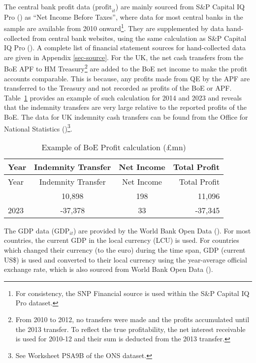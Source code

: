 \documentclass[
  a4paper,
  abstract=true]{scrartcl}
\theoremstyle{definition}
\begin{document}
The central bank profit data (\(\text{profit}_{it}\)) are mainly sourced
from S\&P Capital IQ Pro () as ``Net Income
Before Taxes'', where data for most central banks in the sample are
available from 2010 onward\footnote{For consistency, the SNP Financial
  source is used within the S\&P Capital IQ Pro dataset.}. They are
supplemented by data hand-collected from central bank websites, using
the same calculation as S\&P Capital IQ Pro
(). A complete list of financial statement
sources for hand-collected data are given in Appendix \ref{sec-source}.
For the UK, the net cash transfers from the BoE APF to HM
Treasury\footnote{From 2010 to 2012, no transfers were made and the
  profits accumulated until the 2013 transfer. To reflect the true
  profitability, the net interest receivable is used for 2010-12 and
  their sum is deducted from the 2013 transfer.} are added to the BoE
net income to make the profit accounts comparable. This is because, any
profits made from QE by the APF are transferred to the Treasury and not
recorded as profits of the BoE or APF.
Table~\ref{tbl-profit-illustration} provides an example of such
calculation for 2014 and 2023 and reveals that the indemnity transfers
are very large relative to the reported profits of the BoE. The data for
UK indemnity cash transfers can be found from the Office for National
Statistics ()\footnote{See Worksheet PSA9B
  of the ONS dataset.}.

\begin{longtable}[]{@{}lccr@{}}
\caption{Example of BoE Profit calculation
(£mn)}\label{tbl-profit-illustration}\tabularnewline
\toprule\noalign{}
Year & Indemnity Transfer & Net Income & Total Profit \\
\midrule\noalign{}
\endfirsthead
\toprule\noalign{}
Year & Indemnity Transfer & Net Income & Total Profit \\
\midrule\noalign{}
\endhead
\bottomrule\noalign{}
\endlastfoot
2014 & 10,898 & 198 & 11,096 \\
2023 & -37,378 & 33 & -37,345 \\
\end{longtable}

The GDP data (\(\text{GDP}_{it}\)) are provided by the World Bank Open
Data (). For most countries, the current
GDP in the local currency (LCU) is used. For countries which changed
their currency (to the euro) during the time span, GDP (current US\$) is
used and converted to their local currency using the year-average
official exchange rate, which is also sourced from World Bank Open Data
().
\end{document}
